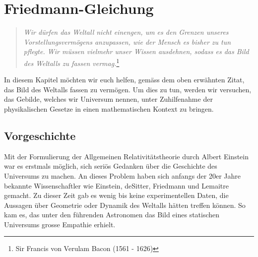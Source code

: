 \chapter{Friedmann-Gleichung\label{chapter:thema}}
\begin{refsection}
\printbibliography[heading=subbibliography]
\rhead{}
\begin{quote}
	\textit{Wir dürfen das Weltall nicht einengen, um es den Grenzen unseres Vorstellungsvermögens anzupassen, wie der Mensch es bisher zu tun pflegte. Wir müssen vielmehr unser Wissen ausdehnen, sodass es das Bild des Weltalls zu fassen vermag.}\footnote{Sir Francis von Verulam Bacon (1561 - 1626)}
\end{quote}
In diesem Kapitel möchten wir euch helfen, gemäss dem oben erwähnten Zitat, das Bild des Weltalls fassen zu vermögen. Um dies zu tun, werden wir versuchen, das Gebilde, welches wir Universum nennen, unter Zuhilfenahme der physikalischen Gesetze in einen mathematischen Kontext zu bringen.


\section{Vorgeschichte}
Mit der Formulierung der Allgemeinen Relativitätstheorie durch Albert Einstein war es erstmals möglich,
sich seriös Gedanken über die Geschichte des
Universums zu machen. An dieses Problem haben sich anfangs der 20er Jahre bekannte Wissenschaftler wie Einstein, deSitter, Friedmann und Lemaitre gemacht. 
Zu dieser Zeit gab es wenig bis keine experimentellen Daten, die Aussagen über Geometrie oder Dynamik des Weltalls hätten treffen können. So kam es, das unter den führenden Astronomen das Bild eines statischen Universums grosse Empathie erhielt.


\end{refsection}
